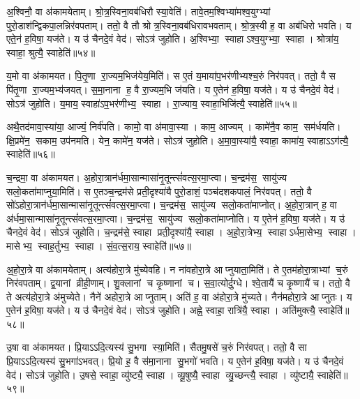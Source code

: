अ॒श्विनौ॒ वा अ॑कामयेताम्।
श्रो॒त्र॒स्विना॒वब॑धिरौ स्या॒वेति॑।
तावे॒तम॒श्विभ्या॑मश्व॒युग्भ्यां पुरो॒डाश॑न्द्विकपा॒लन्निर॑वपताम्।
ततो॒ वै तौ श्रोत्र॒स्विना॒वब॑धिरावभवताम्।
श्रो॒त्र॒स्वी ह॒ वा अब॑धिरो भवति।
य एते॒न॑ ह॒विषा॒ यज॑ते।
य उ॑ चैनदे॒वं वेद॑।
सोऽत्र॑ जुहोति।
अ॒श्विभ्या॒ स्वाहाऽश्व॒युग्भ्या॒ स्वाहा।
श्रोत्रा॑य॒ स्वाहा॒ श्रुत्यै॒ स्वाहेति॑॥५४॥

य॒मो वा अ॑कामयत।
पि॒तृ॒णा रा॒ज्यम॒भिज॑येय॒मिति॑।
स ए॒तं य॒माया॑प॒भर॑णीभ्यश्च॒रुं निर॑पवत्।
ततो॒ वै स पि॑तृ॒णा रा॒ज्यम॒भ्य॑जयत्।
स॒मा॒नाना ह॒ वै रा॒ज्यम॒भि ज॑यति।
य ए॒तेन॑ ह॒विषा॒ यज॑ते।
य उ॑ चैनदे॒वं वेद॑।
सोऽत्र॑ जुहोति।
य॒माय॒ स्वाहा॑ऽप॒भर॑णीभ्य॒ स्वाहा।
रा॒ज्याय॒ स्वाहा॒भिजि॑त्यै॒ स्वाहेति॑॥५५॥

अथै॒तद॑मावा॒स्या॑या॒ आज्यं॒ निर्व॑पति।
कामो॒ वा अ॑मावा॒स्या।
काम॒ आज्यम्।
कामे॑नै॒व काम॒ सम॑र्धयति।
क्षि॒प्रमे॑न॒ सकाम॒ उप॑नमति।
येन॒ कामे॑न॒ यज॑ते।
सोऽत्र॑ जुहोति।
अ॒मा॒वा॒स्या॑यै॒ स्वाहा॒ कामा॑य॒ स्वाहाऽऽग॑त्यै॒ स्वाहेति॑॥५६॥\anuvakamend[मि॒त्र इन्द्र॑ प्र॒जाप॑ति॒र्दश॑ द॒शाप॒ एका॑दश॒ विश्वे॒ ब्रह्म॒ दश॑दश॒ विष्णु॒स्त्रयो॑दश॒ वस॑व॒ इन्द्रो॒ऽजोऽहि॒र्वै बु॒ध्निय॑ पू॒षाऽश्विनौ॑ य॒मो दश॑ द॒शाथै॒तद॑मावा॒स्या॑या अ॒ष्टौ पञ्च॑दश]

च॒न्द्रमा॒ वा अ॑कामयत।
अ॒होरा॒त्रान॑र्धमा॒सान्मासा॑नृ॒तून्त्सं॑वत्स॒रमा॒प्त्वा।
च॒न्द्रम॑स॒ सायु॑ज्य सलो॒कता॑माप्नुया॒मिति॑।
स ए॒तञ्च॒न्द्रम॑से प्रती॒दृश्या॑यै पुरो॒डाशं॒ पञ्च॑दशकपालं॒ निर॑वपत्।
ततो॒ वै सो॑ऽहोरा॒त्रान॑र्धमा॒सान्मासा॑नृ॒तून्त्सं॑वत्स॒रमा॒प्त्वा।
च॒न्द्रम॑स॒ सायु॑ज्य सलो॒कता॑माप्नोत्।
अ॒हो॒रा॒त्रान् ह॒ वा अ॑र्धमा॒सान्मासा॑नृ॒तून्त्सं॑वत्स॒रमा॒प्त्वा।
च॒न्द्रम॑स॒ सायु॑ज्य सलो॒कता॑माप्नोति।
य ए॒तेन॑ ह॒विषा॒ यज॑ते।
य उ॑ चैनदे॒वं वेद॑।
सोऽत्र॑ जुहोति।
च॒न्द्रम॑से॒ स्वाहा प्रती॒दृश्या॑यै॒ स्वाहा।
अ॒हो॒रा॒त्रेभ्य॒ स्वाहाऽर्धमा॒सेभ्य॒ स्वाहा।
मासेभ्य॒ स्वाह॒र्तुभ्य॒ स्वाहा।
सं॒व॒त्स॒राय॒ स्वाहेति॑॥५७॥

अ॒हो॒रा॒त्रे वा अ॑कामयेताम्।
अत्य॑होरा॒त्रे मु॑च्येवहि।
न ना॑वहोरा॒त्रे आप्नुयाता॒मिति॑।
ते ए॒तम॑होरा॒त्राभ्यां च॒रुं निर॑वपताम्।
द्व॒यानां व्रीही॒णाम्।
शु॒क्लानां च कृ॒ष्णानां च।
स॒वा॒त्योर्दु॒ग्धे।
श्वे॒तायै॑ च कृ॒ष्णायै॑ च।
ततो॒ वै ते अत्य॑होरा॒त्रे अ॑मुच्येते।
नैने॑ अहोरा॒त्रे आप्नुताम्।
अति॑ ह॒ वा अ॑होरा॒त्रे मु॑च्यते।
नैन॑महोरा॒त्रे आप्नुतः।
य ए॒तेन॑ ह॒विषा॒ यज॑ते।
य उ॑ चैनदे॒वं वेद॑।
सोऽत्र॑ जुहोति।
अह्ने॒ स्वाहा॒ रात्रि॑यै॒ स्वाहा।
अति॑मुक्त्यै॒ स्वाहेति॑॥५८॥

उ॒षा वा अ॑कामयत।
प्रि॒याऽऽदि॒त्यस्य॑ सु॒भगा स्या॒मिति॑।
सैतमु॒षसे॑ च॒रुं निर॑वपत्।
ततो॒ वै सा प्रि॒याऽऽदि॒त्यस्य॑ सु॒भगा॑ऽभवत्।
प्रि॒यो ह॒ वै स॑मा॒नाना सु॒भगो॑ भवति।
य ए॒तेन॑ ह॒विषा॒ यज॑ते।
य उ॑ चैनदे॒वं वेद॑।
सोऽत्र॑ जुहोति।
उ॒षसे॒ स्वाहा॒ व्यु॑ष्ट्यै॒ स्वाहा।
व्यू॒षुष्यै॒ स्वाहा व्यु॒च्छन्त्यै॒ स्वाहा।
व्यु॑ष्टायै॒ स्वाहेति॑॥५९॥

